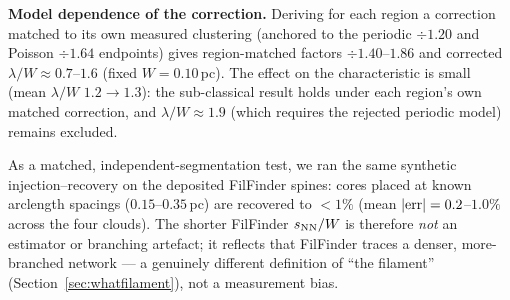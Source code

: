 \documentclass[usenatbib,twoside,twocolumn]{mnras}
\begin{document}
\smallskip\noindent\textbf{Model dependence of the correction.}\label{sec:injection_recovery_model}
Deriving for each region a correction matched to its own measured clustering (anchored to the periodic $\div1.20$ and Poisson $\div1.64$ endpoints) gives region-matched factors $\div1.40$--$1.86$ and corrected $\lambda/W\approx0.7$--$1.6$ (fixed $W=0.10$\,pc). The effect on the characteristic is small (mean $\lambda/W$ $1.2\to1.3$): the sub-classical result holds under each region's own matched correction, and $\lambda/W\approx1.9$ (which requires the rejected periodic model) remains excluded.

As a matched, independent-segmentation test, we ran the same synthetic injection--recovery on the deposited FilFinder spines: cores placed at known arclength spacings ($0.15$--$0.35$\,pc) are recovered to $<1\%$ (mean $|{\rm err}|=0.2$--$1.0\%$ across the four clouds). The shorter FilFinder $s_{\rm NN}/W$ is therefore \emph{not} an estimator or branching artefact; it reflects that FilFinder traces a denser, more-branched network --- a genuinely different definition of ``the filament'' (Section~\ref{sec:whatfilament}), not a measurement bias.
\end{document}
